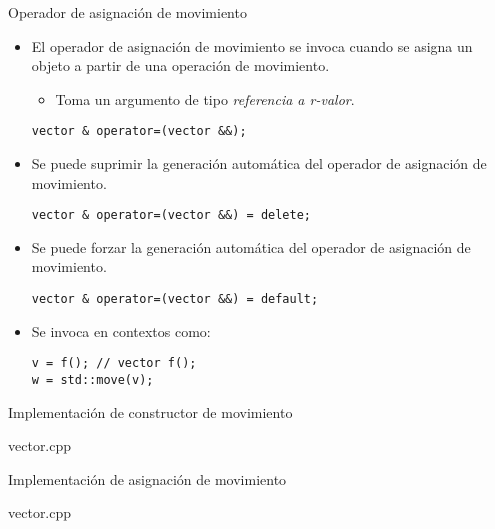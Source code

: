 \begin{frame}[fragile]{Operador de asignación de movimiento}
\begin{itemize}
  \item El \alert{operador de asignación de movimiento} se invoca cuando se asigna un objeto
        a partir de una operación de movimiento.
    \begin{itemize}
      \item Toma un argumento de tipo \emph{referencia a r-valor}.
    \end{itemize}
\begin{lstlisting}
vector & operator=(vector &&);
\end{lstlisting}
  \item Se puede suprimir la generación automática del operador de asignación de movimiento.
\begin{lstlisting}
vector & operator=(vector &&) = delete;
\end{lstlisting}
  \item Se puede forzar la generación automática del operador de asignación de movimiento.
\begin{lstlisting}
vector & operator=(vector &&) = default;
\end{lstlisting}
  \item Se invoca en contextos como:
\begin{lstlisting}
v = f(); // vector f();
w = std::move(v);
\end{lstlisting}
\end{itemize}
\end{frame}

\begin{frame}{Implementación de constructor de movimiento}
\begin{block}{vector.cpp}

\end{block}
\end{frame}

\begin{frame}{Implementación de asignación de movimiento}
\begin{block}{vector.cpp}

\end{block}
\end{frame}
